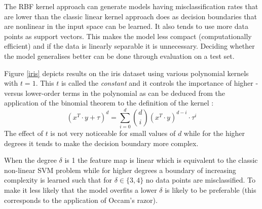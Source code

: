 \par\noindent The RBF kernel approach can generate models having misclassification rates that are lower than the classic linear kernel approach does as decision boundaries that are nonlinear in the input space can be learned. It also tends to use more data points as support vectors. This makes the model less compact (computationally efficient) and if the data is linearly separable it is unnecessary. Deciding whether the model generalises better can be done through evaluation on a test set.


Figure \ref{iris} depicts results on the iris dataset using various polynomial kernels with $t=1$. This $t$ is called the \textit{constant} and it controls the importance of higher - versus lower-order terms in the polynomial as can be deduced from the application of the binomial theorem to the definition of the kernel :
$$(x^T\cdot y+\tau)^d=\sum_{i=0}^d\binom{d}{i}(x^T\cdot y)^{d-i}\cdot \tau^i$$
The effect of $t$ is not very noticeable for small values of $d$ while for the higher degrees it tends to make the decision boundary more complex.

\par\noindent When the degree $\delta$ is 1 the feature map is linear which is equivalent to the classic non-linear SVM problem while for higher degrees a boundary of increasing complexity is learned such that for $\delta\in\{3,4\}$ no data points are misclassified. To make it less likely that the model overfits a lower $\delta$ is likely to be preferable (this corresponds to the application of Occam's razor).

